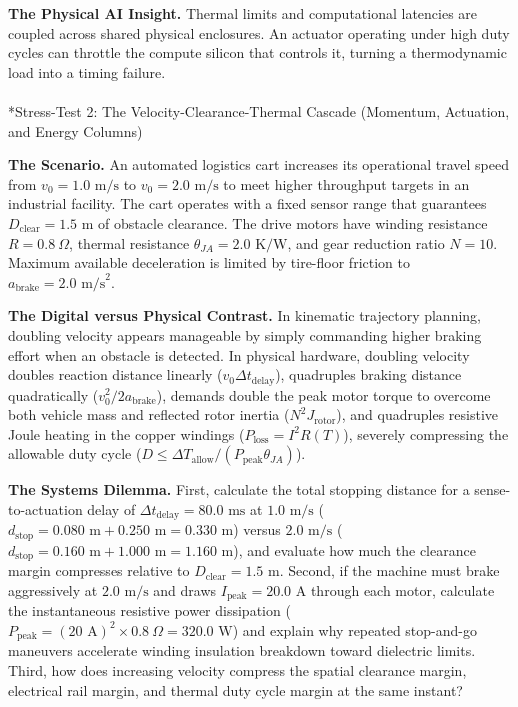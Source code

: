 \documentclass[
  letterpaper,
  DIV=11,
  numbers=noendperiod]{scrartcl}
\makeatletter
\let\oldparagraph\paragraph
\renewcommand{\paragraph}{
    \@ifstar
      \xxxParagraphStar
      \xxxParagraphNoStar
  }
\newcommand{\xxxParagraphStar}[1]{\oldparagraph*{#1}\mbox{}}
\newcommand{\xxxParagraphNoStar}[1]{\oldparagraph{#1}\mbox{}}
\makeatother
\begin{document}
\textbf{The Physical AI Insight.} Thermal limits and computational
latencies are coupled across shared physical enclosures. An actuator
operating under high duty cycles can throttle the compute silicon that
controls it, turning a thermodynamic load into a timing failure.

\paragraph*{Stress-Test 2: The Velocity-Clearance-Thermal Cascade
(Momentum, Actuation, and Energy
Columns)}\label{stress-test-2-the-velocity-clearance-thermal-cascade-momentum-actuation-and-energy-columns}

\textbf{The Scenario.} An automated logistics cart increases its
operational travel speed from \(v_0 = 1.0\text{ m/s}\) to
\(v_0 = 2.0\text{ m/s}\) to meet higher throughput targets in an
industrial facility. The cart operates with a fixed sensor range that
guarantees \(D_{\text{clear}} = 1.5\text{ m}\) of obstacle clearance.
The drive motors have winding resistance \(R = 0.8\ \Omega\), thermal
resistance \(\theta_{JA} = 2.0\text{ K/W}\), and gear reduction ratio
\(N = 10\). Maximum available deceleration is limited by tire-floor
friction to \(a_{\text{brake}} = 2.0\text{ m/s}^2\).

\textbf{The Digital versus Physical Contrast.} In kinematic trajectory
planning, doubling velocity appears manageable by simply commanding
higher braking effort when an obstacle is detected. In physical
hardware, doubling velocity doubles reaction distance linearly
(\(v_0 \Delta t_{\text{delay}}\)), quadruples braking distance
quadratically (\(v_0^2 / 2a_{\text{brake}}\)), demands double the peak
motor torque to overcome both vehicle mass and reflected rotor inertia
(\(N^2 J_{\text{rotor}}\)), and quadruples resistive Joule heating in
the copper windings (\(P_{\text{loss}} = I^2 R(T)\)), severely
compressing the allowable duty cycle
(\(D \le \Delta T_{\text{allow}} / (P_{\text{peak}} \theta_{JA})\)).

\textbf{The Systems Dilemma.} First, calculate the total stopping
distance for a sense-to-actuation delay of
\(\Delta t_{\text{delay}} = 80.0\text{ ms}\) at \(1.0\text{ m/s}\)
(\(d_{\text{stop}} = 0.080\text{ m} + 0.250\text{ m} = 0.330\text{ m}\))
versus \(2.0\text{ m/s}\)
(\(d_{\text{stop}} = 0.160\text{ m} + 1.000\text{ m} = 1.160\text{ m}\)),
and evaluate how much the clearance margin compresses relative to
\(D_{\text{clear}} = 1.5\text{ m}\). Second, if the machine must brake
aggressively at \(2.0\text{ m/s}\) and draws
\(I_{\text{peak}} = 20.0\text{ A}\) through each motor, calculate the
instantaneous resistive power dissipation
(\(P_{\text{peak}} = (20\text{ A})^2 \times 0.8\ \Omega = 320.0\text{ W}\))
and explain why repeated stop-and-go maneuvers accelerate winding
insulation breakdown toward dielectric limits. Third, how does
increasing velocity compress the spatial clearance margin, electrical
rail margin, and thermal duty cycle margin at the same instant?
\end{document}
